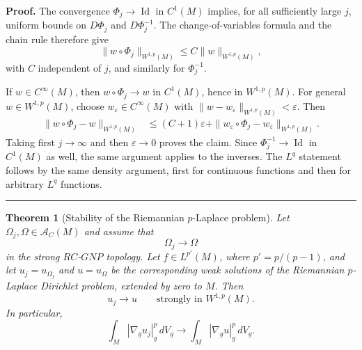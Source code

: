 \documentclass{article}
\newtheorem{theorem}{Theorem}[section]
\newenvironment{proof}[1][Proof]{\textbf{#1.} }{\hfill\rule{0.5em}{0.5em}}
\begin{document}
\begin{proof}
The convergence $\Phi_j\to\operatorname{Id}$ in $C^1(M)$ implies, for all
sufficiently large $j$, uniform bounds on $D\Phi_j$ and $D\Phi_j^{-1}$.
The change-of-variables formula and the chain rule therefore give
\[
\|w\circ\Phi_j\|_{W^{1,p}(M)}\le C\|w\|_{W^{1,p}(M)},
\]
with $C$ independent of $j$, and similarly for $\Phi_j^{-1}$.

If $w\in C^\infty(M)$, then $w\circ\Phi_j\to w$ in $C^1(M)$, hence
in $W^{1,p}(M)$. For general $w\in W^{1,p}(M)$, choose
$w_\varepsilon\in C^\infty(M)$ with
$\|w-w_\varepsilon\|_{W^{1,p}(M)}<\varepsilon$. Then
\begin{align*}
\|w\circ\Phi_j-w\|_{W^{1,p}(M)}
&\le (C+1)\varepsilon
+\|w_\varepsilon\circ\Phi_j-w_\varepsilon\|_{W^{1,p}(M)}.
\end{align*}
Taking first $j\to\infty$ and then $\varepsilon\to0$ proves the claim.
Since $\Phi_j^{-1}\to\operatorname{Id}$ in $C^1(M)$ as well, the same argument
applies to the inverses. The $L^q$ statement follows by the same density
argument, first for continuous functions and then for arbitrary
$L^q$ functions.
\end{proof}

\begin{theorem}[Stability of the Riemannian $p$-Laplace problem]
\label{thm:stability-p-laplace}
Let $\Omega_j,\Omega\in\mathcal A_C(M)$ and assume that
\[
\Omega_j\longrightarrow\Omega
\]
in the strong $RC$-$GNP$ topology. Let
$f\in L^{p'}(M)$, where $p'=p/(p-1)$, and let
$u_j=u_{\Omega_j}$ and $u=u_\Omega$ be the corresponding weak
solutions of the Riemannian $p$-Laplace Dirichlet problem, extended by
zero to $M$. Then
\[
u_j\longrightarrow u
\qquad\text{strongly in }W^{1,p}(M).
\]
In particular,
\[
\int_M|\nabla_g u_j|_g^p\,dV_g
\longrightarrow
\int_M|\nabla_g u|_g^p\,dV_g.
\]
\end{theorem}
\end{document}
